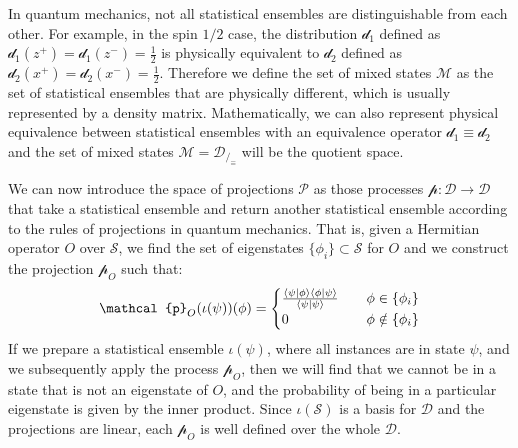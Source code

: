 \documentclass[11pt]{article}
\begin{document}
In quantum mechanics, not all statistical ensembles are distinguishable from each other. For example, in the spin $1/2$ case, the distribution $\mathcal{d}_1$ defined as $\mathcal{d}_1(z^+)=\mathcal{d}_1(z^-)=\frac{1}{2}$ is physically equivalent to $\mathcal{d}_2$ defined as $\mathcal{d}_2(x^+)=\mathcal{d}_2(x^-)=\frac{1}{2}$. Therefore we define the set of mixed states $\mathcal{M}$ as the set of statistical ensembles that are physically different, which is usually represented by a density matrix. Mathematically, we can also represent physical equivalence between statistical ensembles with an equivalence operator $\mathcal{d}_1 \equiv \mathcal{d}_2$ and the set of mixed states $\mathcal{M} = \mathcal{D}_{/_\equiv}$ will be the quotient space.

We can now introduce the space of projections $\mathcal{P}$ as those processes $\mathcal{p} : \mathcal{D} \to \mathcal{D}$ that take a statistical ensemble and return another statistical ensemble according to the rules of projections in quantum mechanics. That is, given a Hermitian operator $O$ over $\mathcal{S}$, we find the set of eigenstates $\{\phi_i\} \subset \mathcal{S}$ for $O$ and we construct the projection $\mathcal{p}_O$ such that:
\begin{equation}\label{transition_probability}
\mathcal{p}_O(\iota(\psi))(\phi) = 
\begin{cases}
\frac{\braket{\psi | \phi} \braket{\phi|\psi}}{\braket{\psi|\psi}} &\quad\phi \in \{\phi_i\}\\
0 &\quad\phi \notin \{\phi_i\}\\
\end{cases}
\end{equation}
If we prepare a statistical ensemble $\iota(\psi)$, where all instances are in state $\psi$, and we subsequently apply the process $\mathcal{p}_O$, then we will find that we cannot be in a state that is not an eigenstate of $O$, and the probability of being in a particular eigenstate is given by the inner product. Since $\iota(\mathcal{S})$ is a basis for $\mathcal{D}$ and the projections are linear, each $\mathcal{p}_O$ is well defined over the whole $\mathcal{D}$.
\end{document}
